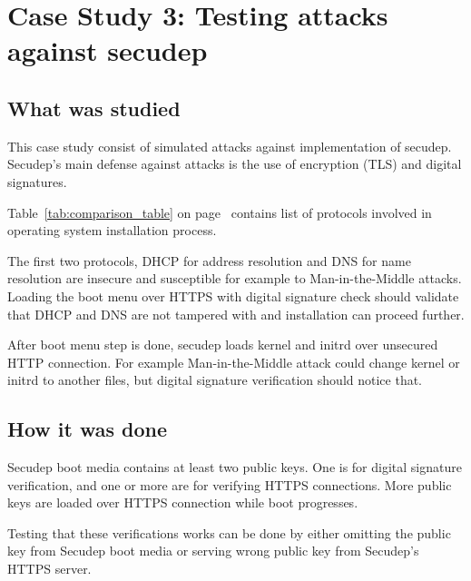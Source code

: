 \section{Case Study 3: Testing attacks against secudep}
\label{sec:casestudy3}

\subsection{What was studied}

This case study consist of simulated attacks against implementation of
secudep. Secudep's main defense against attacks is the use of
encryption (TLS) and digital signatures.

Table~\ref{tab:comparison_table} on
page~\pageref{tab:comparison_table} contains list of protocols
involved in operating system installation process.

The first two protocols, DHCP for address resolution and DNS for name
resolution are insecure and susceptible for example to
Man-in-the-Middle attacks. Loading the boot menu over HTTPS with
digital signature check should validate that DHCP and DNS are not
tampered with and installation can proceed further.

After boot menu step is done, secudep loads kernel and initrd over
unsecured HTTP connection. For example Man-in-the-Middle attack could
change kernel or initrd to another files, but digital signature
verification should notice that.


\subsection{How it was done}

Secudep boot media contains at least two public keys. One is for
digital signature verification, and one or more are for verifying
HTTPS connections. More public keys are loaded over HTTPS connection
while boot progresses.

Testing that these verifications works can be done by either omitting
the public key from Secudep boot media or serving wrong public key
from Secudep's HTTPS server.

